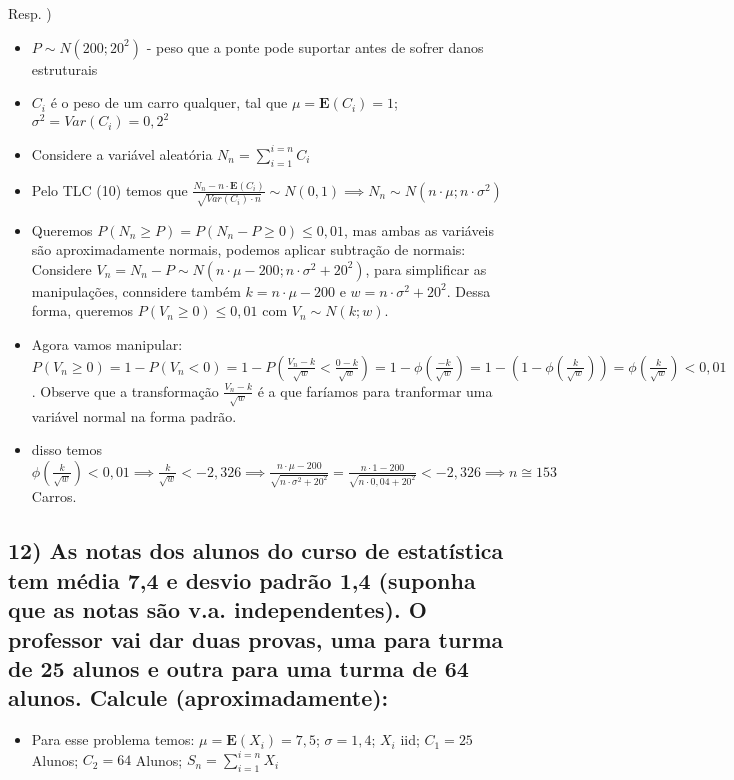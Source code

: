 \documentclass[portuguese]{article}
\begin{document}
Resp. )
\begin{itemize}
\item $P\sim N(200;20^{2})$ - peso que a ponte pode suportar antes de sofrer
danos estruturais
\item $C_{i}$ é o peso de um carro qualquer, tal que $\mu=\mathbf{E}(C_{i})=1$;
$\sigma^{2}=Var(C_{i})=0,2^{2}$
\item Considere a variável aleatória $N_{n}=\sum_{i=1}^{i=n}C_{i}$
\item Pelo TLC (10) temos que $\frac{N_{n}-n\cdot\mathbf{E}(C_{i})}{\sqrt{Var(C_{i})\cdot n}}\sim N(0,1)\implies N_{n}\sim N(n\cdot\mu;n\cdot\sigma^{2})$
\item Queremos $P(N_{n}\ge P)=P(N_{n}-P\ge0)\le0,01$, mas ambas as variáveis
são aproximadamente normais, podemos aplicar subtração de normais:
Considere $V_{n}=N_{n}-P\sim N(n\cdot\mu-200;n\cdot\sigma^{2}+20^{2})$,
para simplificar as manipulações, connsidere também $k=n\cdot\mu-200$
e $w=n\cdot\sigma^{2}+20^{2}$. Dessa forma, queremos $P(V_{n}\ge0)\le0,01$
com $V_{n}\sim N(k;w)$.
\item Agora vamos manipular: $P(V_{n}\ge0)=1-P(V_{n}<0)=1-P(\frac{V_{n}-k}{\sqrt{w}}<\frac{0-k}{\sqrt{w}})=1-\phi(\frac{-k}{\sqrt{w}})=1-(1-\phi(\frac{k}{\sqrt{w}}))=\phi(\frac{k}{\sqrt{w}})<0,01$.
Observe que a transformação $\frac{V_{n}-k}{\sqrt{w}}$ é a que faríamos
para tranformar uma variável normal na forma padrão.
\item disso temos $\phi(\frac{k}{\sqrt{w}})<0,01\implies\frac{k}{\sqrt{w}}<-2,326\implies\frac{n\cdot\mu-200}{\sqrt{n\cdot\sigma^{2}+20^{2}}}=\frac{n\cdot1-200}{\sqrt{n\cdot0,04+20^{2}}}<-2,326\implies n\cong153$
Carros.
\end{itemize}

\subsection*{\textcompwordmark{}}


\subsection*{\textmd{12) As notas dos alunos do curso de estatística tem média
7,4 e desvio padrão 1,4 (suponha que as notas são v.a. independentes).
O professor vai dar duas provas, uma para turma de 25 alunos e outra
para uma turma de 64 alunos. Calcule (aproximadamente): }}
\begin{itemize}
\item Para esse problema temos: $\mu=\mathbf{E}(X_{i})=7,5$; $\sigma=1,4$;
$X_{i}$ iid; $C_{1}=25$ Alunos; $C_{2}=64$ Alunos; $S_{n}=\sum_{i=1}^{i=n}X_{i}$
\end{itemize}
\end{document}
